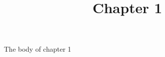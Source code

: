 \documentclass{article}
\begin{document}
\title{Chapter 1}

\maketitle


The body of chapter 1
\end{document}

